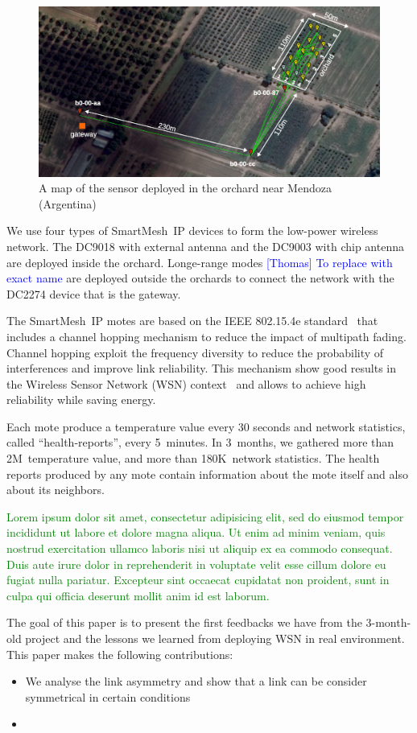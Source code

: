 \documentclass{sig-alternate}
\newcommand{\lorem}               {\textcolor{green}{Lorem ipsum dolor sit amet, consectetur adipisicing elit, sed do eiusmod tempor incididunt ut labore et dolore magna aliqua. Ut enim ad minim veniam, quis nostrud exercitation ullamco laboris nisi ut aliquip ex ea commodo consequat. Duis aute irure dolor in reprehenderit in voluptate velit esse cillum dolore eu fugiat nulla pariatur. Excepteur sint occaecat cupidatat non proident, sunt in culpa qui officia deserunt mollit anim id est laborum.}}
\newcommand{\thomas}[1]             {\textcolor{blue}{[Thomas] #1}}
\newcommand{\smip}                  {SmartMesh~IP\xspace}
\begin{document}
\begin{figure}
    \centering
    \includegraphics[width=\textwidth]{map_annotated}
    \caption{A map of the sensor deployed in the orchard near Mendoza (Argentina)}
    \label{fig:map}
\end{figure}


We use four types of \smip devices to form the low-power wireless network.
The DC9018 with external antenna and the DC9003 with chip antenna are deployed inside the orchard.
Longe-range modes \thomas{To replace with exact name} are deployed outside the orchards to connect the network with the DC2274 device that is the gateway.


The \smip motes are based on the IEEE 802.15.4e standard~\cite{std_ieee802154e} that includes a channel hopping mechanism to reduce the impact of multipath fading.
Channel hopping exploit the frequency diversity to reduce the probability of interferences and improve link reliability.
This mechanism show good results in the Wireless Sensor Network (WSN) context~\cite{watteyne2010mitigating, watteyne2009reliability} and allows to achieve high reliability while saving energy.


Each mote produce a temperature value every 30 seconds and network statistics, called ``health-reports'', every 5~minutes.
In 3~months, we gathered more than 2M~temperature value, and more than 180K~network statistics.
The health reports produced by any mote contain information about the mote itself and also about its neighbors.


\lorem


The goal of this paper is to present the first feedbacks we have from the 3-month-old project and the lessons we learned from deploying WSN in real environment.
This paper makes the following contributions:
\begin{itemize}
    \item{We analyse the link asymmetry and show that a link can be consider symmetrical in certain conditions}
    \item{}
\end{itemize}
\end{document}
